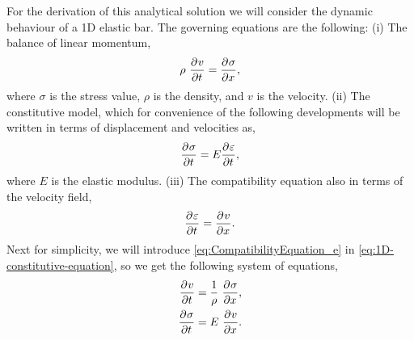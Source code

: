 For the derivation of this analytical solution we will consider  the
dynamic behaviour of a 1D elastic bar. The governing equations are the
following: (i) The balance of linear momentum,
\begin{equation}
  \label{eq:1D-balance-linear-momentum}
  \rho\ \frac{\partial^{}{v}}{ \partial {t}^{} } = \frac{\partial^{}{\sigma}}{ \partial {x}^{} },
\end{equation}
where $\sigma$ is the stress value, $\rho$ is the density, and 
$v$ is the velocity. (ii) The constitutive model, which for convenience of the
following developments will be written in terms of displacement and
velocities as, 
\begin{equation}
  \label{eq:1D-constitutive-equation}
  \frac{\partial^{}{\sigma}}{ \partial {t}^{} } = E \frac{\partial^{}{\varepsilon}}{ \partial {t}^{} },
\end{equation}
where $E$ is the elastic modulus. (iii) The compatibility equation
also in terms of the velocity field,
\begin{equation}
  \label{eq:CompatibilityEquation_e}
  \frac{\partial^{}{\varepsilon}}{ \partial {t}^{} } = \frac{\partial^{}{v}}{ \partial {x}^{} }.
\end{equation}
Next for simplicity, we will introduce \eqref{eq:CompatibilityEquation_e} in 
\eqref{eq:1D-constitutive-equation}, so we get the following system of equations,
\begin{align}
  \label{eq:1D-balance-linear-momentum-II}
  \frac{\partial^{}{v}}{ \partial {t}^{} } &= \frac{1}{\rho}\ \frac{\partial^{}{\sigma}}{ \partial {x}^{} }, \\
  \label{eq:1D-constitutive-equation-II}
  \frac{\partial^{}{\sigma}}{ \partial {t}^{} } &= E\ \frac{\partial^{}{v}}{ \partial {x}^{} }.
\end{align}

